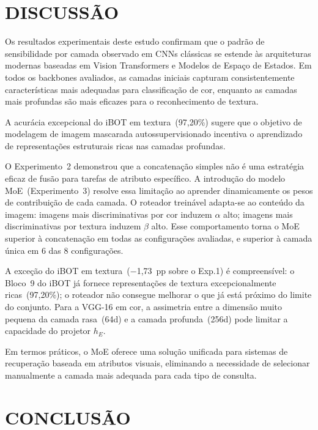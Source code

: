 \documentclass[letterpaper, 10 pt, conference]{ieeeconf}
\begin{document}
\section{DISCUSSÃO}

Os resultados experimentais deste estudo confirmam que o padrão de
sensibilidade por camada observado em CNNs clássicas se estende às
arquiteturas modernas baseadas em Vision Transformers e Modelos de Espaço
de Estados.
Em todos os backbones avaliados, as camadas iniciais capturam
consistentemente características mais adequadas para classificação de cor,
enquanto as camadas mais profundas são mais eficazes para o reconhecimento
de textura.

A acurácia excepcional do iBOT em textura~(97,20\%) sugere que o objetivo
de modelagem de imagem mascarada autossupervisionado incentiva o aprendizado
de representações estruturais ricas nas camadas profundas.

O Experimento~2 demonstrou que a concatenação simples não é uma estratégia
eficaz de fusão para tarefas de atributo específico.
A introdução do modelo MoE~(Experimento~3) resolve essa limitação ao
aprender dinamicamente os pesos de contribuição de cada camada.
O roteador treinável adapta-se ao conteúdo da imagem: imagens mais
discriminativas por cor induzem $\alpha$ alto; imagens mais discriminativas
por textura induzem $\beta$ alto.
Esse comportamento torna o MoE superior à concatenação em todas as
configurações avaliadas, e superior à camada única em 6 das 8 configurações.

A exceção do iBOT em textura~($-$1,73~pp sobre o Exp.1) é compreensível:
o Bloco~9 do iBOT já fornece representações de textura excepcionalmente
ricas~(97,20\%); o roteador não consegue melhorar o que já está próximo do
limite do conjunto.
Para a VGG-16 em cor, a assimetria entre a dimensão muito pequena da camada
rasa~(64d) e a camada profunda~(256d) pode limitar a capacidade do projetor
$h_E$.

Em termos práticos, o MoE oferece uma solução unificada para sistemas de
recuperação baseada em atributos visuais, eliminando a necessidade de
selecionar manualmente a camada mais adequada para cada tipo de consulta.

\section{CONCLUSÃO}
\end{document}
